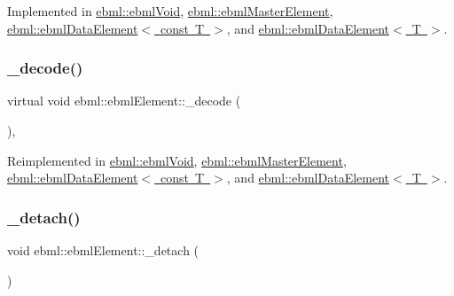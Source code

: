 Implemented in \mbox{\hyperlink{classebml_1_1ebmlVoid_a4d5d56b3b45c18c5732a4e0d68762f87}{ebml\+::ebml\+Void}}, \mbox{\hyperlink{classebml_1_1ebmlMasterElement_af181a3280da5c875497324955f75e62c}{ebml\+::ebml\+Master\+Element}}, \mbox{\hyperlink{classebml_1_1ebmlDataElement_3_01const_01T_01_4_a425794d8e3dd48e30dc1eb29e600de85}{ebml\+::ebml\+Data\+Element$<$ const T $>$}}, and \mbox{\hyperlink{classebml_1_1ebmlDataElement_a8a3c04faedabb3667e6750fd2d563c59}{ebml\+::ebml\+Data\+Element$<$ T $>$}}.

\mbox{\label{classebml_1_1ebmlElement_adf579591cece6b61d85cdb48861c3620}} 
\subsubsection{\texorpdfstring{\+\_\+decode()}{\_decode()}\hspace{0.1cm}{\footnotesize\ttfamily [2/2]}}
{\footnotesize\ttfamily virtual void ebml\+::ebml\+Element\+::\+\_\+decode (\begin{DoxyParamCaption}\item[{const \mbox{\hyperlink{classebml_1_1parseFile}{parse\+File}} \&}]{ }\end{DoxyParamCaption})\hspace{0.3cm}{\ttfamily [protected]}, {\ttfamily [virtual]}}



Reimplemented in \mbox{\hyperlink{classebml_1_1ebmlVoid_a3bf4c4cb979b33f513fd224329aee162}{ebml\+::ebml\+Void}}, \mbox{\hyperlink{classebml_1_1ebmlMasterElement_a0c96ec791e04e776c8f7ae969e164855}{ebml\+::ebml\+Master\+Element}}, \mbox{\hyperlink{classebml_1_1ebmlDataElement_3_01const_01T_01_4_ad5bc71b4d9aa91a02cf888a06e116482}{ebml\+::ebml\+Data\+Element$<$ const T $>$}}, and \mbox{\hyperlink{classebml_1_1ebmlDataElement_a54798682308de38d13ebf05ca4f6df7e}{ebml\+::ebml\+Data\+Element$<$ T $>$}}.

\mbox{\label{classebml_1_1ebmlElement_ac567afa28f18f9327299d47b1ab64550}} 
\subsubsection{\texorpdfstring{\+\_\+detach()}{\_detach()}}
{\footnotesize\ttfamily void ebml\+::ebml\+Element\+::\+\_\+detach (\begin{DoxyParamCaption}{ }\end{DoxyParamCaption})\hspace{0.3cm}{\ttfamily [protected]}}


